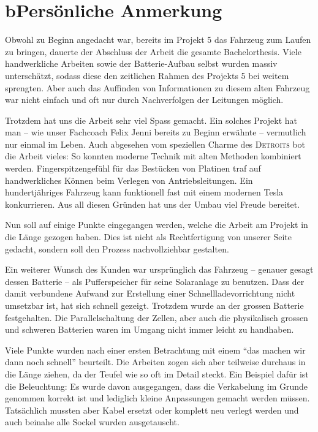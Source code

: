 \chapter*{b\quad Persönliche Anmerkung}
Obwohl zu Beginn angedacht war, bereits im Projekt 5 das Fahrzeug zum Laufen zu bringen, dauerte der Abschluss der Arbeit die gesamte Bachelorthesis. Viele handwerkliche Arbeiten sowie der Batterie-Aufbau selbst wurden massiv unterschätzt, sodass diese den zeitlichen Rahmen des Projekts 5 bei weitem sprengten. Aber auch das Auffinden von Informationen zu diesem alten Fahrzeug war nicht einfach und oft nur durch Nachverfolgen der Leitungen möglich.

Trotzdem hat uns die Arbeit sehr viel Spass gemacht. Ein solches Projekt hat man -- wie unser Fachcoach Felix Jenni bereits zu Beginn erwähnte -- vermutlich nur einmal im Leben. Auch abgesehen vom speziellen Charme des \textsc{Detroits} bot die Arbeit vieles: So konnten moderne Technik mit alten Methoden kombiniert werden. Fingerspitzengefühl für das Bestücken von Platinen traf auf handwerkliches Können beim Verlegen von Antriebsleitungen. Ein hundertjähriges Fahrzeug kann funktionell fast mit einem modernen Tesla konkurrieren. Aus all diesen Gründen hat uns der Umbau viel Freude bereitet.

Nun soll auf einige Punkte eingegangen werden, welche die Arbeit am Projekt in die Länge gezogen haben. Dies ist nicht als Rechtfertigung von unserer Seite gedacht, sondern soll den Prozess nachvollziehbar gestalten.

Ein weiterer Wunsch des Kunden war ursprünglich das Fahrzeug -- genauer gesagt dessen Batterie -- als Pufferspeicher für seine Solaranlage zu benutzen. Dass der damit verbundene Aufwand zur Erstellung einer Schnellladevorrichtung nicht umsetzbar ist, hat sich schnell gezeigt. Trotzdem wurde an der grossen Batterie festgehalten. Die Parallelschaltung der Zellen, aber auch die physikalisch grossen und schweren Batterien waren im Umgang nicht immer leicht zu handhaben.

Viele Punkte wurden nach einer ersten Betrachtung mit einem "`das machen wir dann noch schnell"' beurteilt. Die Arbeiten zogen sich aber teilweise durchaus in die Länge ziehen, da der Teufel wie so oft im Detail steckt. Ein Beispiel dafür ist die Beleuchtung: Es wurde davon ausgegangen, dass die Verkabelung im Grunde genommen korrekt ist und lediglich kleine Anpassungen gemacht werden müssen. Tatsächlich mussten aber Kabel ersetzt oder komplett neu verlegt werden und auch beinahe alle Sockel wurden ausgetauscht.

